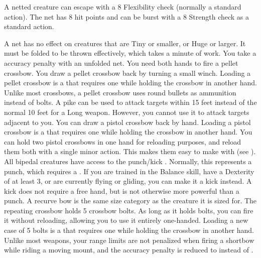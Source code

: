     \par A netted creature can escape with a  8 Flexibility check (normally a standard action). The net has 8 hit points and can be burst with a  8 Strength check as a standard action.
    \par A net has no effect on creatures that are Tiny or smaller, or Huge or larger. It must be folded to be thrown effectively, which takes a minute of work. You take a  accuracy penalty with an unfolded net.
     You need both hands to fire a pellet crossbow.
    You draw a pellet crossbow back by turning a small winch.
    Loading a pellet crossbow is a  that requires one  while holding the crossbow in another hand.
    Unlike most crossbows, a pellet crossbow uses round bullets as ammunition instead of bolts.
     A pike can be used to attack targets within 15 feet instead of the normal 10 feet for a Long weapon.
    However, you cannot use it to attack targets adjacent to you.
     You can draw a pistol crossbow back by hand.
    Loading a pistol crossbow is a  that requires one  while holding the crossbow in another hand.
    You can hold two pistol crossbows in one hand for reloading purposes, and reload them both with a single minor action.
    This makes them easy to make  with (see ).
     All bipedal creatures have access to the punch/kick .
    Normally, this represents a punch, which requires a .
    If you are trained in the Balance skill, have a Dexterity of at least 3, or are currently flying or gliding, you can make it a kick instead.
    A kick does not require a free hand, but is not otherwise more powerful than a punch.
     A recurve bow is the same size category as the creature it is sized for.
     The repeating crossbow holds 5 crossbow bolts.
    As long as it holds bolts, you can fire it without reloading, allowing you to use it entirely one-handed.
    Loading a new case of 5 bolts is a  that requires one  while holding the crossbow in another hand.
     Unlike most  weapons, your range limits are not penalized when firing a shortbow while riding a moving mount, and the accuracy penalty is reduced to  instead of .
